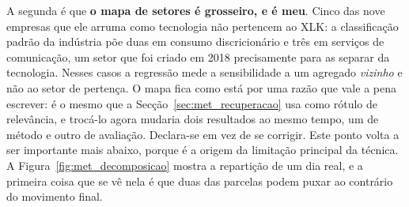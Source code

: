 A segunda é que \textbf{o mapa de setores é grosseiro, e é meu}. Cinco das nove empresas que ele
arruma como tecnologia não pertencem ao XLK: a classificação padrão da indústria põe duas em
consumo discricionário e três em serviços de comunicação, um setor que foi criado em 2018
precisamente para as separar da tecnologia. Nesses casos a regressão mede a
sensibilidade a um agregado \emph{vizinho} e não ao setor de pertença. O mapa fica como está por uma
razão que vale a pena escrever: é o mesmo que a Secção~\ref{sec:met_recuperacao} usa como rótulo de
relevância, e trocá-lo agora mudaria dois resultados ao mesmo tempo, um de método e outro de
avaliação. Declara-se em vez de se corrigir. Este ponto
volta a ser importante mais abaixo, porque é a origem da limitação principal da técnica. A
Figura~\ref{fig:met_decomposicao} mostra a repartição de um dia real, e a primeira coisa que
se vê nela é que duas das parcelas podem puxar ao contrário do movimento final.

